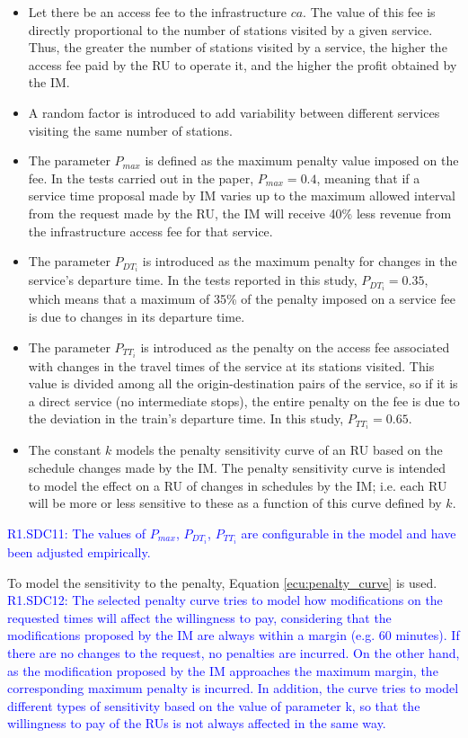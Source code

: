 \documentclass[Afour,sagev,times]{sagej}
\newcommand{\primero}[1]{\textcolor{blue}{#1}}
\begin{document}
\begin{itemize}
    \item Let there be an access fee to the infrastructure $ca$. The value of this fee is directly proportional to the number of stations visited by a given service. Thus, the greater the number of stations visited by a service, the higher the access fee paid by the \gls{RU} to operate it, and the higher the profit obtained by the \gls{IM}.
    \item A random factor is introduced to add variability between different services visiting the same number of stations.
    \item The parameter $P_{max}$ is defined as the maximum penalty value imposed on the fee. In the tests carried out in the paper, $P_{max} = 0.4$, meaning that if a service time proposal made by \gls{IM} varies up to the maximum allowed interval from the request made by the \gls{RU}, the \gls{IM} will receive 40\% less revenue from the infrastructure access fee for that service.
    \item The parameter $P_{DT_{i}}$ is introduced as the maximum penalty for changes in the service's departure time. In the tests reported in this study, $P_{DT_{i}} = 0.35$, which means that a maximum of 35\% of the penalty imposed on a service fee is due to changes in its departure time.
    \item The parameter $P_{TT_{i}}$ is introduced as the penalty on the access fee associated with changes in the travel times of the service at its stations visited. This value is divided among all the origin-destination pairs of the service, so if it is a direct service (no intermediate stops), the entire penalty on the fee is due to the deviation in the train's departure time. In this study, $P_{TT_{i}}=0.65$.
    \item The constant $ k $ models the penalty sensitivity curve of an \gls{RU} based on the schedule changes made by the \gls{IM}. The penalty sensitivity curve is intended to model the effect on a \gls{RU} of changes in schedules by the \gls{IM}; i.e. each \gls{RU} will be more or less sensitive to these as a function of this curve defined by $k$.
    \end{itemize}

\primero{R1.SDC11: The values of $P_{max}$, $P_{DT_{i}}$, $P_{TT_{i}}$ are configurable in the model and have been adjusted empirically.}

To model the sensitivity to the penalty, Equation \ref{ecu:penalty_curve} is used. \primero{R1.SDC12: The selected penalty curve tries to model how modifications on the requested times will affect the willingness to pay, considering that the modifications proposed by the \gls{IM} are always within a margin (e.g. 60 minutes). If there are no changes to the request, no penalties are incurred. On the other hand, as the modification proposed by the \gls{IM} approaches the maximum margin, the corresponding maximum penalty is incurred. In addition, the curve tries to model different types of sensitivity based on the value of parameter k, so that the willingness to pay of the \glspl{RU} is not always affected in the same way.}
\end{document}
